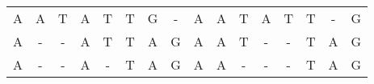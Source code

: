 \begingroup\centering
\begin{tabular}{cccccccc|cccccccc}
A & A & T & A & T & T & G & - & A & A & T & A & T & T & - & G \\
A & - & - & A & T & T & A & G & A & A & T & - & - & T & A & G \\
A & - & - & A & - & T & A & G & A & A & - & - & - & T & A & G \\
\end{tabular}
\par\endgroup
